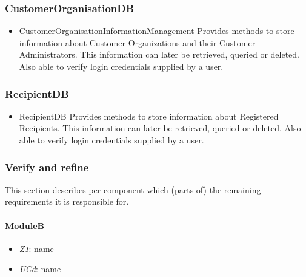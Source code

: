 \documentclass[a4paper,10pt]{article}
\begin{document}
\subsubsection*{CustomerOrganisationDB}
\begin{itemize}
	\item CustomerOrganisationInformationManagement
	Provides methods to store information about Customer Organizations and their Customer Administrators. This information can later be retrieved, queried or deleted. Also able to verify login credentials supplied by a user.
\end{itemize}

\subsubsection*{RecipientDB}
\begin{itemize}
	\item RecipientDB
	Provides methods to store information about Registered Recipients. This information can later be retrieved, queried or deleted. Also able to verify login credentials supplied by a user.
\end{itemize}

\subsubsection{Verify and refine}
This section describes per component which (parts of) the remaining
requirements it is responsible for.

\paragraph{ModuleB}
\begin{itemize}
    \item \emph{Z1}: name
    \item \emph{UCd}: name
\end{itemize}
\end{document}
